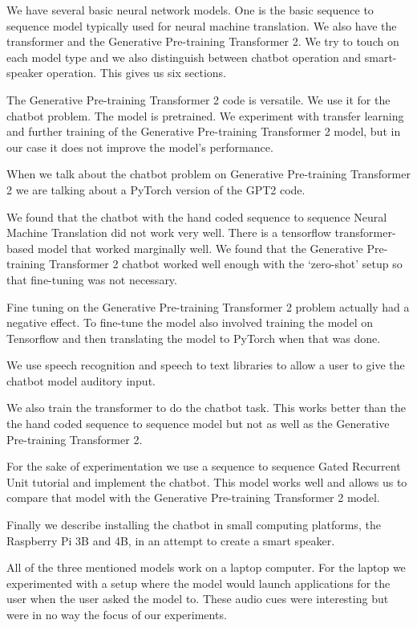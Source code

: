 We have several basic neural network models. One is the basic sequence to sequence model typically used for neural machine translation. We also have the transformer and the Generative Pre-training Transformer 2. We try to touch on each model type and we also distinguish between chatbot operation and smart-speaker operation. This gives us six sections.

The Generative Pre-training Transformer 2 code is versatile. We use it for the chatbot problem. The model is pretrained. We experiment with transfer learning and further training of the Generative Pre-training Transformer 2 model, but in our case it does not improve the model's performance. 

When we talk about the chatbot problem on Generative Pre-training Transformer 2 we are talking about a PyTorch version of the GPT2 code. 

We found that the chatbot with the hand coded sequence to sequence Neural Machine Translation did not work very well. There is a tensorflow transformer-based model that worked marginally well. We found that the Generative Pre-training Transformer 2 chatbot worked well enough with the `zero-shot' setup so that fine-tuning was not necessary. 

Fine tuning on the Generative Pre-training Transformer 2 problem actually had a negative effect. To fine-tune the model also involved training the model on Tensorflow and then translating the model to PyTorch when that was done. 

We use speech recognition and speech to text libraries to allow a user to give the chatbot model auditory input.

We also train the transformer to do the chatbot task. This works better than the the hand coded sequence to sequence model but not as well as the Generative Pre-training Transformer 2. 

For the sake of experimentation we use a sequence to sequence Gated Recurrent Unit tutorial and implement the chatbot. This model works well and allows us to compare that model with the Generative Pre-training Transformer 2 model.

Finally we describe installing the chatbot in small computing platforms, the Raspberry Pi 3B and 4B, in an attempt to create a smart speaker.

All of the three mentioned models work on a laptop computer. For the laptop we experimented with a setup where the model would launch applications for the user when the user asked the model to. These audio cues were interesting but were in no way the focus of our experiments.

